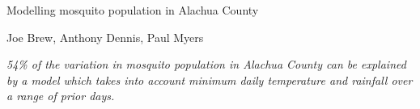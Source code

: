 \documentclass{article}
\begin{document}




\begin{center}
\begin{huge}
Modelling mosquito population in Alachua County\\
\end{huge}
\begin{large}
\vspace{8mm}
Joe Brew, Anthony Dennis, Paul Myers
\vspace{8mm}
\end{large}
\end{center}

\noindent \emph{54\% of the variation in mosquito population in Alachua County can be explained by a  model which takes into account minimum daily temperature and rainfall over a range of prior days.}
\end{document}
